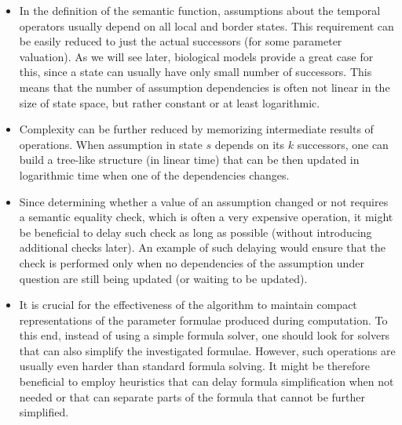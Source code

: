 \begin{itemize}
	\item In the definition of the semantic function, assumptions about the temporal operators usually depend on all local and border states. This requirement can be easily reduced to just the actual successors (for some parameter valuation). As we will see later, biological models provide a great case for this, since a state can usually have only small number of successors. This means that the number of assumption dependencies is often not linear in the size of state space, but rather constant or at least logarithmic.
	\item Complexity can be further reduced by memorizing intermediate results of operations. When assumption in state $s$ depends on its $k$ successors, one can build a tree-like structure (in linear time) that can be then updated in logarithmic time when one of the dependencies changes.
	\item Since determining whether a value of an assumption changed or not requires a semantic equality check, which is often a very expensive operation, it might be beneficial to delay such check as long as possible (without introducing additional checks later). An example of such delaying would ensure that the check is performed only when no dependencies of the assumption under question are still being updated (or waiting to be updated).
	\item It is crucial for the effectiveness of the algorithm to maintain compact representations of the parameter formulae produced during computation. To this end, instead of using a simple formula solver, one should look for solvers that can also simplify the investigated formulae. However, such operations are usually even harder than standard formula solving. It might be therefore beneficial to employ heuristics that can delay formula simplification when not needed or that can separate parts of the formula that cannot be further simplified.
\end{itemize}

